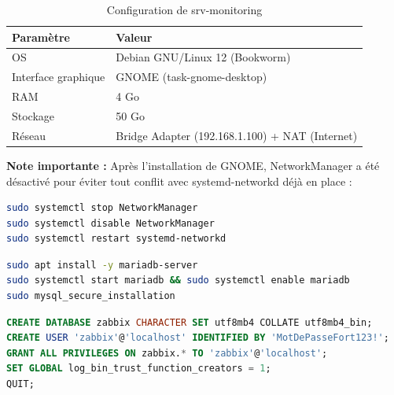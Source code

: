 \documentclass[a4paper,12pt,openany,oneside]{article}
\begin{document}
\newpage



\begin{table}[H]
\centering
\begin{tabular}{ll}
\toprule
\textbf{Paramètre} & \textbf{Valeur} \\
\midrule
OS & Debian GNU/Linux 12 (Bookworm) \\
Interface graphique & GNOME (task-gnome-desktop) \\
RAM & 4 Go \\
Stockage & 50 Go \\
Réseau & Bridge Adapter (192.168.1.100) + NAT (Internet) \\
\bottomrule
\end{tabular}
\caption{Configuration de srv-monitoring}
\label{tab:srv-monitoring}
\end{table}

\textbf{Note importante :} Après l'installation de GNOME, NetworkManager a été désactivé pour éviter tout conflit avec systemd-networkd déjà en place :

\begin{lstlisting}[language=bash]
sudo systemctl stop NetworkManager
sudo systemctl disable NetworkManager
sudo systemctl restart systemd-networkd
\end{lstlisting}


\begin{lstlisting}[language=bash]
sudo apt install -y mariadb-server
sudo systemctl start mariadb && sudo systemctl enable mariadb
sudo mysql_secure_installation
\end{lstlisting}


\begin{lstlisting}[language=sql]
CREATE DATABASE zabbix CHARACTER SET utf8mb4 COLLATE utf8mb4_bin;
CREATE USER 'zabbix'@'localhost' IDENTIFIED BY 'MotDePasseFort123!';
GRANT ALL PRIVILEGES ON zabbix.* TO 'zabbix'@'localhost';
SET GLOBAL log_bin_trust_function_creators = 1;
QUIT;
\end{lstlisting}
\end{document}
